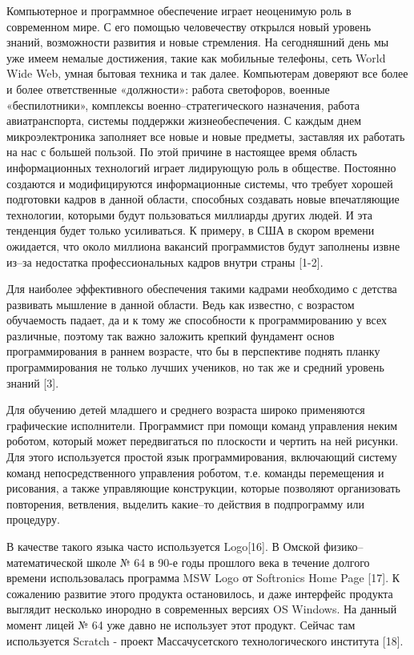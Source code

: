 Компьютерное и программное обеспечение  играет неоценимую роль в современном мире. С его помощью человечеству открылся новый уровень знаний, возможности развития и новые стремления. На сегодняшний день мы уже имеем немалые достижения, такие как мобильные телефоны, сеть World Wide Web, умная бытовая техника и так далее. Компьютерам доверяют все более и более ответственные «должности»: работа светофоров, военные «беспилотники», комплексы военно–стратегического назначения, работа авиатранспорта, системы поддержки жизнеобеспечения. С каждым днем микроэлектроника заполняет все новые и новые предметы, заставляя их работать на нас с большей пользой. По этой причине в настоящее время область информационных технологий играет лидирующую роль в обществе. Постоянно создаются и модифицируются информационные системы, что требует хорошей подготовки кадров в данной области, способных создавать новые впечатляющие технологии, которыми будут пользоваться миллиарды других людей. И эта тенденция будет только усиливаться. К примеру, в США в скором времени ожидается, что около миллиона вакансий программистов будут заполнены извне из–за недостатка профессиональных кадров внутри страны [1-2].\par
 Для наиболее эффективного обеспечения такими кадрами необходимо с детства развивать мышление в данной области. Ведь как известно, с возрастом обучаемость падает, да и к тому же способности к программированию у всех различные, поэтому так важно заложить крепкий фундамент основ программирования в раннем возрасте, что бы в перспективе поднять планку программирования не только лучших учеников, но так же и средний уровень знаний [3].\par
Для обучению детей младшего и среднего возраста широко применяются графические исполнители. Программист при помощи команд управления неким роботом, который может передвигаться по плоскости и чертить на ней рисунки. Для этого используется простой язык программирования, включающий систему команд непосредственного управления роботом, т.е. команды перемещения и рисования, а также управляющие конструкции, которые позволяют организовать повторения, ветвления, выделить какие–то действия в подпрограмму или процедуру.\par
В качестве такого языка часто используется Logo[16]. В Омской физико–математической школе № 64 в 90-е годы прошлого века в течение долгого времени использовалась программа MSW Logo от Softronics Home Page [17]. К сожалению развитие этого продукта остановилось, и даже интерфейс продукта выглядит несколько инородно в современных версиях OS Windows. На данный момент лицей № 64 уже давно не использует этот продукт. Сейчас там используется Scratch - проект Массачусетского технологического института [18].\par
